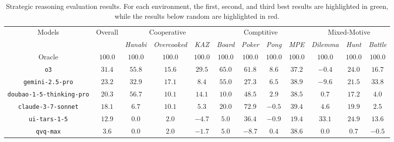 \begin{table}[t]
\centering
\caption{Strategic reasoning evaluation results. For each environment, the \colorbox{first}{first}, \colorbox{second}{second}, and \colorbox{third}{third} best results are highlighted in green, while the results \colorbox{below}{below random} are highlighted in red.}
\label{tab:reasoning}
\scriptsize
\setlength{\tabcolsep}{6.5pt}
\begin{tabular}{cccccccccccc}
\toprule
\multirow{2}{*}{Models}
& \multirow{2}{*}{Overall} & \multicolumn{3}{c}{Cooperative} & \multicolumn{4}{c}{Comptitive} & \multicolumn{3}{c}{Mixed-Motive} \\
& & \textit{Hanabi} & \textit{Overcooked} & \textit{KAZ} & \textit{Board}
& \textit{Poker}    & \textit{Pong} & \textit{MPE} & \textit{Dilemma} & \textit{Hunt} & \textit{Battle} \\
\midrule
Oracle & $100.0$ & $100.0$ & $100.0$ & $100.0$ & $100.0$ & $100.0$ & $100.0$ & $100.0$ & $100.0$ & $100.0$ & $100.0$ \\
\midrule
\texttt{o3} & \cellcolor{first} $31.4$ & \cellcolor{second} $55.8$ & \cellcolor{second} $15.6$ & \cellcolor{first} $29.5$ & \cellcolor{first} $65.0$ & \cellcolor{second} $61.8$ & \cellcolor{first} $8.6$ & $37.2$ & \cellcolor{below} $-0.4$ & \cellcolor{second} $24.0$ & \cellcolor{second} $16.7$ \\
\texttt{gemini-2.5-pro} & \cellcolor{second} $23.2$ & \cellcolor{third} $32.9$ & \cellcolor{first} $17.1$ & \cellcolor{third} $8.4$ & \cellcolor{second} $55.0$ & $27.3$ & \cellcolor{second} $6.5$ & \cellcolor{second} $38.9$ & \cellcolor{below} $-9.6$ & \cellcolor{third} $21.5$ & \cellcolor{first} $33.8$ \\
\texttt{doubao-1-5-thinking-pro} & \cellcolor{third} $20.3$ & \cellcolor{first} $56.7$ & $10.1$ & \cellcolor{second} $14.1$ & $10.0$ & \cellcolor{third} $48.5$ & \cellcolor{third} $2.9$ & $38.5$ & $0.7$ & $17.2$ & $4.0$ \\
\texttt{claude-3-7-sonnet} & $18.1$ & $6.7$ & \cellcolor{third} $10.1$ & $5.3$ & \cellcolor{third} $20.0$ & \cellcolor{first} $72.9$ & \cellcolor{below} $-0.5$ & \cellcolor{first} $39.4$ & $4.6$ & $19.9$ & $2.5$ \\
\texttt{ui-tars-1-5} & $12.9$ & \cellcolor{equal} $0.0$ & $2.0$ & \cellcolor{below} $-4.7$ & $5.0$ & $36.4$ & \cellcolor{below} $-0.9$ & $19.4$ & \cellcolor{first} $33.1$ & \cellcolor{first} $24.9$ & \cellcolor{third} $13.6$ \\
\texttt{qvq-max} & $3.6$ & \cellcolor{equal} $0.0$ & $2.0$ & \cellcolor{below} $-1.7$ & $5.0$ & \cellcolor{below} $-8.7$ & $0.4$ & \cellcolor{third} $38.6$ & \cellcolor{equal} $0.0$ & $0.7$ & \cellcolor{below} $-0.5$ \\

\end{tabular}
\end{table}
